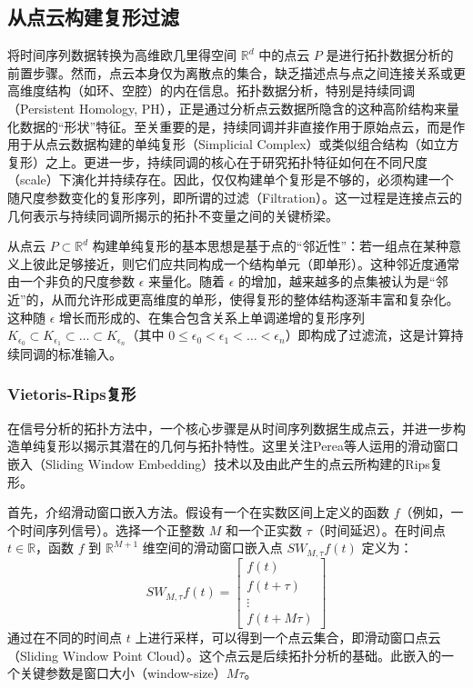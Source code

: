 \subsection{从点云构建复形过滤}
将时间序列数据转换为高维欧几里得空间 $\mathbb{R}^d$ 中的点云 $P$ 是进行拓扑数据分析的前置步骤。然而，点云本身仅为离散点的集合，缺乏描述点与点之间连接关系或更高维度结构（如环、空腔）的内在信息。拓扑数据分析，特别是持续同调（Persistent Homology, PH），正是通过分析点云数据所隐含的这种高阶结构来量化数据的“形状”特征。至关重要的是，持续同调并非直接作用于原始点云，而是作用于从点云数据构建的单纯复形（Simplicial Complex）或类似组合结构（如立方复形）之上。更进一步，持续同调的核心在于研究拓扑特征如何在不同尺度（scale）下演化并持续存在。因此，仅仅构建单个复形是不够的，必须构建一个随尺度参数变化的复形序列，即所谓的过滤（Filtration）。这一过程是连接点云的几何表示与持续同调所揭示的拓扑不变量之间的关键桥梁。

从点云 $P \subset \mathbb{R}^d$ 构建单纯复形的基本思想是基于点的“邻近性”：若一组点在某种意义上彼此足够接近，则它们应共同构成一个结构单元（即单形）。这种邻近度通常由一个非负的尺度参数 $\epsilon$ 来量化。随着 $\epsilon$ 的增加，越来越多的点集被认为是“邻近”的，从而允许形成更高维度的单形，使得复形的整体结构逐渐丰富和复杂化。这种随 $\epsilon$ 增长而形成的、在集合包含关系上单调递增的复形序列 $K_{\epsilon_0} \subset K_{\epsilon_1} \subset \dots \subset K_{\epsilon_n}$（其中 $0 \le \epsilon_0 < \epsilon_1 < \dots < \epsilon_n$）即构成了过滤流，这是计算持续同调的标准输入。

\subsubsection{Vietoris-Rips复形}
在信号分析的拓扑方法中，一个核心步骤是从时间序列数据生成点云，并进一步构造单纯复形以揭示其潜在的几何与拓扑特性。这里关注Perea等人\cite{perea2015sliding}运用的滑动窗口嵌入（Sliding Window Embedding）技术以及由此产生的点云所构建的Rips复形。

首先，介绍滑动窗口嵌入方法。假设有一个在实数区间上定义的函数 $f$（例如，一个时间序列信号）。选择一个正整数 $M$ 和一个正实数 $\tau$（时间延迟）。在时间点 $t \in \mathbb{R}$，函数 $f$ 到 $\mathbb{R}^{M+1}$ 维空间的滑动窗口嵌入点 $SW_{M,\tau}f(t)$ 定义为：
\begin{equation}
SW_{M,\tau}f(t) = \begin{bmatrix} f(t) \\ f(t+\tau) \\ \vdots \\ f(t+M\tau) \end{bmatrix}
\end{equation}
通过在不同的时间点 $t$ 上进行采样，可以得到一个点云集合，即滑动窗口点云（Sliding Window Point Cloud）。这个点云是后续拓扑分析的基础。此嵌入的一个关键参数是窗口大小（window-size）$M\tau$。

